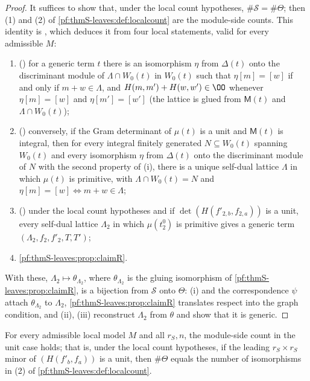 \begin{proof}
It suffices to show that, under the local count hypotheses, $\#\mathcal S=\#\Theta$; then (1) and (2) of
\cref{pf:thmS-leaves:def:localcount} are the module-side counts. This identity is ,
which deduces it from four local statements, valid for every admissible $M$:
\begin{enumerate}[label=(\roman*)]
\item () for a generic term $t$ there is an isomorphism $\eta$ from $\Delta(t)$ onto the
discriminant module of $\Lambda\cap W_0(t)$ in $W_0(t)$ such that $\eta[m]=[w]$ if and only if $m+w\in\Lambda$, and $H(m,m')+H(w,w')\in\OO$ whenever
$\eta[m]=[w]$ and $\eta[m']=[w']$ (the lattice is glued from $\mathsf M(t)$ and $\Lambda\cap W_0(t)$);
\item () conversely, if the Gram determinant of $\mu(t)$ is a unit and $\mathsf M(t)$ is integral,
then for every integral finitely generated $N\subseteq W_0(t)$ spanning $W_0(t)$ and every isomorphism $\eta$ from $\Delta(t)$ onto the
discriminant module of $N$ with the second property of (i), there is a unique self-dual lattice $\Lambda$ in which $\mu(t)$ is primitive,
with $\Lambda\cap W_0(t)=N$ and $\eta[m]=[w]\iff m+w\in\Lambda$;
\item () under the local count hypotheses and if $\det(H(f'_{2,b},f_{2,a}))$ is a unit,
every self-dual lattice $\Lambda_2$ in which $\mu(t_2^0)$ is primitive gives a generic term $(\Lambda_2,f_2,f'_2,T,T')$;
\item \cref{pf:thmS-leaves:prop:claimR}.
\end{enumerate}
With these, $\Lambda_2\mapsto\theta_{\Lambda_2}$, where $\theta_{\Lambda_2}$ is the gluing isomorphism of \cref{pf:thmS-leaves:prop:claimR}, is a bijection
from $\mathcal S$ onto $\Theta$: (i) and the correspondence $\psi$ attach $\theta_{\Lambda_2}$ to $\Lambda_2$, \cref{pf:thmS-leaves:prop:claimR} translates
respect into the graph condition, and (ii), (iii) reconstruct $\Lambda_2$ from $\theta$ and show that it is generic.
\end{proof}

\begin{proposition}\label{pf:thmS-leaves:prop:lcunit}
For every admissible local model $M$ and all $r_S,n$, the module-side count in the unit case holds; that is, under the local count
hypotheses, if the leading $r_S\times r_S$ minor of $(H(f'_b,f_a))$ is a unit, then $\#\Theta$ equals the number of isomorphisms in
(2) of \cref{pf:thmS-leaves:def:localcount}.
\end{proposition}


